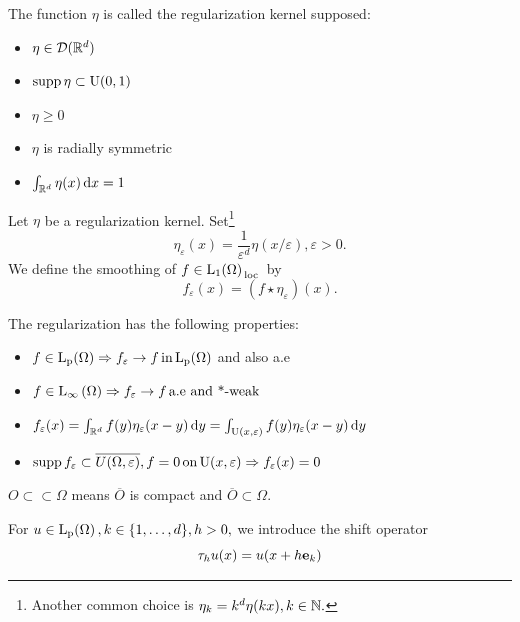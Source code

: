 \documentclass{article}
\begin{document}
\begin{definition}
	The function $\eta$ is called the regularization kernel supposed:
	\begin{itemize}
		\item $\eta \in \mathcal{D}({\mathbb R}^d)$
		\item $\operatorname{supp} \eta \subset \text{U}(0,1)$
		\item $\eta \geq 0$
		\item $\eta$ is radially symmetric
		\item $\int_{{\mathbb R}^d}\eta(x)\dd{x} = 1$
	\end{itemize}
\end{definition}

\begin{definition}
	Let $\eta$ be a regularization kernel. Set\footnote{Another common choice is $\eta_k = k^d \eta\qty(kx), k \in {\mathbb N}.$}
	\[
		\eta_{\varepsilon}(x) = \frac{1}{\varepsilon^{d}} \eta (x/\varepsilon), \varepsilon >0.
	\]
	We define the smoothing of $f \in \LpSet[1]{\Omega}_{\, \text{loc} \,}$ by
	\[
		f_{\varepsilon}(x) = (f \star \eta_{\varepsilon})(x).
	\]
\end{definition}

\begin{remark}
	The regularization has the following properties:
	\begin{itemize}
		\item $f \in \LpSet{\Omega} \Rightarrow f_{\varepsilon} \to f \, \text{in} \, \LpSet{\Omega}$ and also a.e
		\item $f \in \text{L}_{\infty}\!\,\left(\Omega \right) \Rightarrow f_{\varepsilon} \to f \, \text{a.e and *-weak} \,$
		\item $f_{\varepsilon}(x) = \int_{{\mathbb R}^d}f(y)\eta_{\varepsilon}(x-y)\dd{y} = \int_{\text{U}(x,\varepsilon)}f(y) \eta_{\varepsilon}(x-y)\dd{y}$
		\item $\operatorname{supp} f_{\varepsilon} \subset \overline{U(\Omega,\varepsilon)}, f=0 \, \text{on} \,\text{U}(x,\varepsilon) \Rightarrow f_{\varepsilon}(x)=0$
	\end{itemize}
\end{remark}

\begin{definition}
	$O \subset \subset \Omega$ means $\overline{O}$ is compact and $\overline{O}\subset \Omega$.
\end{definition}

\begin{definition}
	For $u \in \LpSet{\Omega}, k \in \{1,\dots,d\}, h >0, $ we introduce the shift operator
	\begin{equation*}
		\tau_h u(x)=u(x+h \vb{e}_k)
	\end{equation*}
\end{definition}
\end{document}
